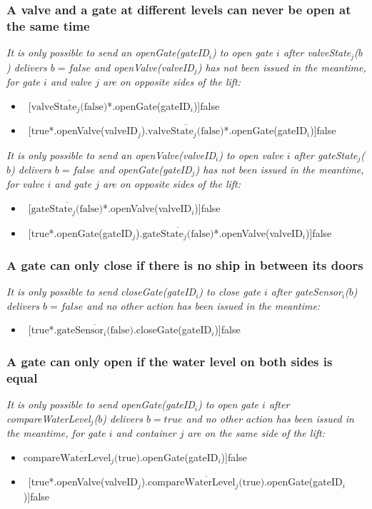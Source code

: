 \subsubsection{A valve and a gate at different levels can never be open at the same time}
\textit{It is only possible to send an openGate(gateID$_i$) to open gate $i$ after valveState$_j$($ b $) delivers $b = false$ and openValve(valveID$_j$) has not been issued in the meantime, for gate $i$ and valve $j$ are on opposite sides of the lift:}
	\begin{itemize}
		\item ~[$\overline{\textrm{valveState$_j$(false)}}$*.openGate(gateID$_i$)]false
		\item ~[true*.openValve(valveID$_j$).$\overline{\textrm{valveState$_j$(false)}}$*.openGate(gateID$_i$)]false
	\end{itemize}

\noindent\textit{It is only possible to send an openValve(valveID$_i$) to open valve $i$ after gateState$_j$($ b $) delivers $b = false$ and openGate(gateID$_j$) has not been issued in the meantime, for valve $i$ and gate $j$ are on opposite sides of the lift:}
	\begin{itemize}
		\item ~[$\overline{\textrm{gateState$_j$(false)}}$*.openValve(valveID$_i$)]false
		\item ~[true*.openGate(gateID$_j$).$\overline{\textrm{gateState$_j$(false)}}$*.openValve(valveID$_i$)]false
	\end{itemize}
	
\subsubsection{A gate can only close if there is no ship in between its doors}
\textit{It is only possible to send closeGate(gateID$_i$) to close gate $i$ after gateSensor$_i$($b$) delivers $b = false$ and no other action has been issued in the meantime:}
	\begin{itemize}
		\item ~[true*.$\overline{\textrm{gateSensor$_i$(false)}}$.closeGate(gateID$_i$)]false
	\end{itemize}
	
\subsubsection{A gate can only open if the water level on both sides is equal}
\textit{It is only possible to send openGate(gateID$_i$) to open gate $i$ after \linebreak compareWaterLevel$_j$($b$) delivers $b = true$ and no other action has been issued in the meantime, for gate $i$ and container $j$ are on the same side of the lift:}
	\begin{itemize}
		\item $\overline{\textrm{compareWaterLevel$_j$(true)}}$.openGate(gateID$_i$)]false
		\item ~[true*.openValve(valveID$_j$).$\overline{\textrm{compareWaterLevel$_j$(true)}}$.openGate(gateID$_i$)]false
	\end{itemize}

